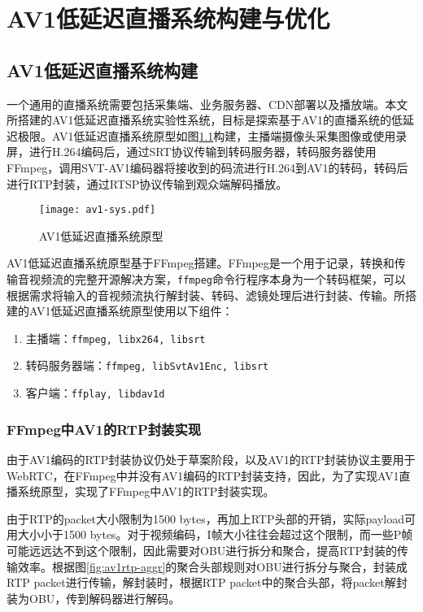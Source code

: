 \chapter{AV1低延迟直播系统构建与优化}

\section{AV1低延迟直播系统构建}
	一个通用的直播系统需要包括采集端、业务服务器、CDN部署以及播放端。本文所搭建的AV1低延迟直播系统实验性系统，目标是探索基于AV1的直播系统的低延迟极限。AV1低延迟直播系统原型如图\ref{fig:av1-sys}构建，主播端摄像头采集图像或使用录屏，进行H.264编码后，通过SRT协议传输到转码服务器，转码服务器使用FFmpeg，调用SVT-AV1编码器将接收到的码流进行H.264到AV1的转码，转码后进行RTP封装，通过RTSP协议传输到观众端解码播放。

  \begin{figure}[!htp]
    \centering
    \texttt{[image: av1-sys.pdf]}
    \caption{AV1低延迟直播系统原型}
   \label{fig:av1-sys}
  \end{figure}

  AV1低延迟直播系统原型基于FFmpeg搭建。FFmpeg是一个用于记录，转换和传输音视频流的完整开源解决方案，\texttt{ffmpeg}命令行程序本身为一个转码框架，可以根据需求将输入的音视频流执行解封装、转码、滤镜处理后进行封装、传输。所搭建的AV1低延迟直播系统原型使用以下组件：
	\begin{enumerate} [label=\arabic*)]
		\item 主播端：\texttt{ffmpeg, libx264, libsrt}
		\item 转码服务器端：\texttt{ffmpeg, libSvtAv1Enc, libsrt}
		\item 客户端：\texttt{ffplay, libdav1d}
	\end{enumerate}
\subsection{FFmpeg中AV1的RTP封装实现}
	由于AV1编码的RTP封装协议\cite{RTPPayloadFormat}仍处于草案阶段，以及AV1的RTP封装协议主要用于WebRTC，在FFmpeg中并没有AV1编码的RTP封装支持，因此，为了实现AV1直播系统原型，实现了FFmpeg中AV1的RTP封装实现。

	由于RTP的packet大小限制为1500 bytes，再加上RTP头部的开销，实际payload可用大小小于1500 bytes。对于视频编码，I帧大小往往会超过这个限制，而一些P帧可能远远达不到这个限制，因此需要对OBU进行拆分和聚合，提高RTP封装的传输效率。根据图\ref{fig:av1rtp-aggr}的聚合头部规则对OBU进行拆分与聚合，封装成RTP packet进行传输，解封装时，根据RTP packet中的聚合头部，将packet解封装为OBU，传到解码器进行解码。

